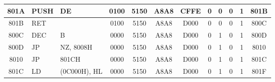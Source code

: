 \documentclass[11pt,a4j]{jsarticle}
\begin{document}
\begin{table}[htb]
\begin{center}
\begin{tabular}{|c|ll|c|c|c|c|c|c|c|c|c|}
801A & PUSH & DE & 0100 & 5150 & A8A8 & CFFE & 0 & 0 & 0 & 1 & 801B \\ \hline
801B & RET &  & 0100 & 5150 &A8A8  & D000 & 0 & 0 & 0 & 1 & 800C \\ \hline
800C & DEC & B & 0000 & 5150 & A8A8 & D000 & 0 & 1 & 0 & 1 & 800D \\ \hline
800D & JP & NZ, 8008H & 0000 & 5150 & A8A8 & D000 & 0 & 1 & 0 & 1 & 8010 \\ \hline
8010 & JP & 801CH & 0000 & 5150 & A8A8 & D000 & 0 & 1 & 0 & 1 & 801C \\ \hline
801C & LD & (0C000H), HL & 0000 & 5150 & A8A8 & D000 & 0 & 1 & 0 & 1 & 801F \\ \hline
    \end{tabular}
    \label{tab:kekka2-3}
  \end{center}
 \end{table}
   
\end{document}
